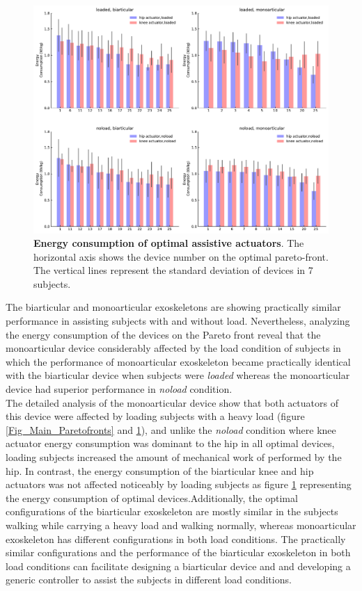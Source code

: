 \documentclass[10pt,letterpaper]{article}
\begin{document}
\begin{figure}[ht]   
	\centering
	\includegraphics[width=\linewidth]{Pareto_Simulations_Figures/PaperFigure_Paretofront_EnergyBarPlot.pdf}
	\vspace{1mm}
	\caption{{\small\textbf{Energy consumption of optimal assistive actuators}. The horizontal axis shows the device number on the optimal pareto-front. The vertical lines represent the standard deviation of devices in 7 subjects.}}
	\label{Fig_Paretofronts_Actuators_EnergyBarPlot}
\end{figure}
The biarticular and monoarticular exoskeletons are showing practically similar performance in assisting subjects with and without load. Nevertheless, analyzing the energy consumption of the devices on the Pareto front reveal that the monoarticular device considerably affected by the load condition of subjects in which the performance of monoarticular exoskeleton became practically identical with the biarticular device when subjects were \textit{loaded} whereas the monoarticular device had superior performance in \textit{noload} condition.\\
The detailed analysis of the monoarticular device show that both actuators of this device were affected by loading subjects with a heavy load (figure \ref{Fig_Main_Paretofronts} and \ref{Fig_Paretofronts_Actuators_EnergyBarPlot}), and unlike the \textit{noload} condition where knee actuator energy consumption was dominant to the hip in all optimal devices, loading subjects increased the amount of mechanical work of performed by the hip. In contrast, the energy consumption of the biarticular knee and hip actuators was not affected noticeably by loading subjects as figure \ref{Fig_Paretofronts_Actuators_EnergyBarPlot} representing the energy consumption of optimal devices.Additionally, the optimal configurations of the biarticular exoskeleton are mostly similar in the subjects walking while carrying a heavy load and walking normally, whereas monoarticular exoskeleton has different configurations in both load conditions. The practically similar configurations and the performance of the biarticular exoskeleton in both load conditions can facilitate designing a biarticular device and and developing a generic controller to assist the subjects in different  load conditions.\\
\end{document}
